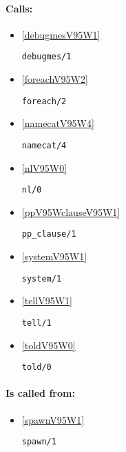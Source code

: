 \paragraph{Calls:} 
\begin{itemize}
\item \ref{debugmesV95W1} 
\begin{verbatim}
debugmes/1
\end{verbatim}

\item \ref{foreachV95W2} 
\begin{verbatim}
foreach/2
\end{verbatim}

\item \ref{namecatV95W4} 
\begin{verbatim}
namecat/4
\end{verbatim}

\item \ref{nlV95W0} 
\begin{verbatim}
nl/0
\end{verbatim}

\item \ref{ppV95WclauseV95W1} 
\begin{verbatim}
pp_clause/1
\end{verbatim}

\item \ref{systemV95W1} 
\begin{verbatim}
system/1
\end{verbatim}

\item \ref{tellV95W1} 
\begin{verbatim}
tell/1
\end{verbatim}

\item \ref{toldV95W0} 
\begin{verbatim}
told/0
\end{verbatim}

\end{itemize}
\paragraph{Is called from:} 
\begin{itemize}
\item \ref{spawnV95W1} 
\begin{verbatim}
spawn/1
\end{verbatim}

\end{itemize}


